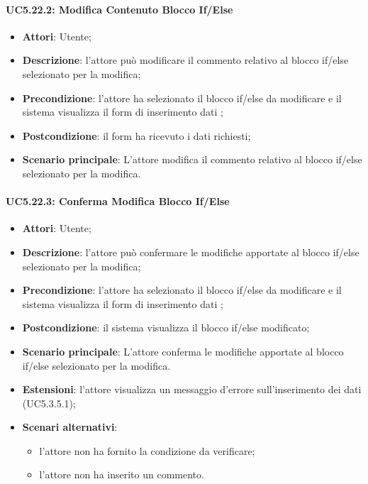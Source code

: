 \paragraph{UC5.22.2: Modifica Contenuto Blocco If/Else}
\label{UC5.22.2}
\begin{itemize}
\item \textbf{Attori}: Utente;
\item \textbf{Descrizione}: l'attore può modificare il commento relativo al blocco if/else selezionato per la modifica;
\item \textbf{Precondizione}: l'attore ha selezionato il blocco if/else da modificare e il sistema visualizza il form di inserimento dati ;	
\item \textbf{Postcondizione}: il form ha ricevuto i dati richiesti;	
\item \textbf{Scenario principale}:
L'attore modifica il commento relativo al blocco if/else selezionato per la modifica.
\end{itemize}
\paragraph{UC5.22.3: Conferma Modifica Blocco If/Else}
\label{UC5.22.3}
\begin{itemize}
\item \textbf{Attori}: Utente;
\item \textbf{Descrizione}: l'attore può confermare le modifiche apportate al blocco if/else selezionato per la modifica;
\item \textbf{Precondizione}: l'attore ha selezionato il blocco if/else da modificare e il sistema visualizza il form di inserimento dati ;	
\item \textbf{Postcondizione}: il sistema visualizza il blocco if/else modificato;	
\item \textbf{Scenario principale}:
L'attore conferma le modifiche apportate al blocco if/else selezionato per la modifica.
\item \textbf{Estensioni}:
l'attore visualizza un messaggio d'errore sull'inserimento dei dati (UC5.3.5.1);	
\item \textbf{Scenari alternativi}:
\begin{itemize}
\item l'attore non ha fornito la condizione da verificare;
\item l'attore non ha inserito un commento.
\end{itemize}
\end{itemize}
